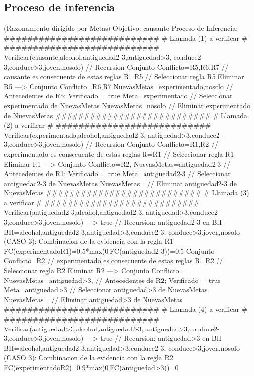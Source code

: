 \subsection{Proceso de inferencia}
\begin{listing}[language=Pascal]
(Razonamiento dirigido por Metas)
Objetivo: causante
Proceso de Inferencia: 
  ###########################
  # Llamada (1) a verificar #
  ###########################
	Verificar(causante,{alcohol,antiguedad2-3,antiguedad>3,
	conduce2-3,conduce>3,joven,nosolo}) // Recursion 
	Conjunto Conflicto={R5,R6,R7} // causante es consecuente de estas reglas
	R={R5} // Seleccionar regla R5
	Eliminar R5 ---> Conjunto Conflicto={R6,R7}
	NuevasMetas={experimentado,nosolo} // Antecedentes de R5; Verificado = true
	Meta=experimentado // Seleccionar experimentado de NuevasMetas
	NuevasMetas={nosolo} // Eliminar experimentado de NuevasMetas
  ###########################
  # Llamada (2) a verificar #
  ###########################
	Verificar(experimentado,{alcohol,antiguedad2-3,
	antiguedad>3,conduce2-3,conduce>3,joven,nosolo})    // Recursion 
	Conjunto Conflicto={R1,R2} // experimentado es consecuente de estas reglas
	R={R1} // Seleccionar regla R1
	Eliminar R1 ---> Conjunto Conflicto={R2,}
	NuevasMetas={antiguedad2-3} // Antecedentes de R1; Verificado = true
	Meta=antiguedad2-3 // Seleccionar antiguedad2-3 de NuevasMetas
	NuevasMetas={} // Eliminar antiguedad2-3 de NuevasMetas
  ###########################
  # Llamada (3) a verificar #
  ###########################
	Verificar(antiguedad2-3,{alcohol,antiguedad2-3,
	antiguedad>3,conduce2-3,conduce>3,joven,nosolo})   ---> true // Recursion: antiguedad2-3 en BH
	BH={alcohol,antiguedad2-3,antiguedad>3,conduce2-3, 
	conduce>3,joven,nosolo}
	(CASO 3): Combinacion de la evidencia con la regla R1
	 FC(experimentado{R1})=0.5*max(0,FC(antiguedad2-3))=0.5
	Conjunto Conflicto={R2} // experimentado es consecuente de estas reglas
	R={R2} // Seleccionar regla R2
	Eliminar R2 ---> Conjunto Conflicto={}
	NuevasMetas={antiguedad>3,} // Antecedentes de R2; Verificado = true
	Meta=antiguedad>3 // Seleccionar antiguedad>3 de NuevasMetas
	NuevasMetas={} // Eliminar antiguedad>3 de NuevasMetas
  ###########################
  # Llamada (4) a verificar #
  ###########################
	Verificar(antiguedad>3,{alcohol,antiguedad2-3,
	antiguedad>3,conduce2-3,conduce>3,joven,nosolo}) ---> true // Recursion: antiguedad>3 en BH
	BH={alcohol,antiguedad2-3,antiguedad>3,conduce2-3,
	conduce>3,joven,nosolo}
	(CASO 3): Combinacion de la evidencia con la regla R2
	 FC(experimentado{R2})=0.9*max(0,FC(antiguedad>3))=0

\end{listing}
